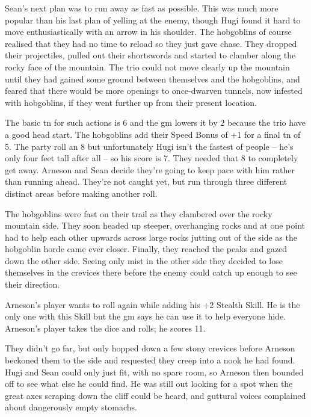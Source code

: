\begin{exampletext}

Sean's next plan was to run away as fast as possible.
This was much more popular than his last plan of yelling at the enemy, though Hugi found it hard to move enthusiastically with an arrow in his shoulder.
The hobgoblins of course realised that they had no time to reload so they just gave chase.
They dropped their projectiles, pulled out their shortswords and started to clamber along the rocky face of the mountain.
The trio could not move clearly up the mountain until they had gained some ground between themselves and the hobgoblins, and feared that there would be more openings to once-dwarven tunnels, now infested with hobgoblins, if they went further up from their present location.

The basic \gls{tn} for such actions is 6 and the \gls{gm} lowers it by 2 because the trio have a good head start.
The hobgoblins add their Speed Bonus of +1 for a final \gls{tn} of 5.
The party roll an 8 but unfortunately Hugi isn't the fastest of people -- he's only four feet tall after all -- so his score is 7.
They needed that 8 to completely get away.
Arneson and Sean decide they're going to keep pace with him rather than running ahead.
They're not caught yet, but run through three different distinct areas before making another roll.

The hobgoblins were fast on their trail as they clambered over the rocky mountain side.
They soon headed up steeper, overhanging rocks and at one point had to help each other upwards across large rocks jutting out of the side as the hobgoblin horde came ever closer.
Finally, they reached the peaks and gazed down the other side.
Seeing only mist in the other side they decided to lose themselves in the crevices there before the enemy could catch up enough to see their direction.

Arneson's player wants to roll again while adding his +2 Stealth Skill. He is the only one with this Skill but the \gls{gm} says he can use it to help everyone hide.  Arneson's player takes the dice and rolls; he scores 11.

They didn't go far, but only hopped down a few stony crevices before Arneson beckoned them to the side and requested they creep into a nook he had found.
Hugi and Sean could only just fit, with no spare room, so Arneson then bounded off to see what else he could find.
He was still out looking for a spot when the great axes scraping down the cliff could be heard, and guttural voices complained about dangerously empty stomachs.

\end{exampletext}
